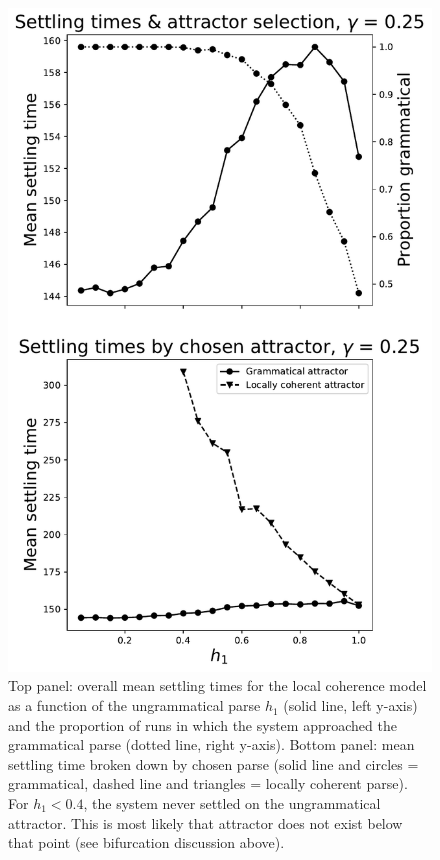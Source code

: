 \documentclass[10pt,letterpaper]{article}
\begin{document}
\begin{figure}[h!]
\includegraphics[width=\linewidth]{../Model/TimesAsFnOfH1.pdf}
\caption{Top panel: overall mean settling times for the local coherence model as a function of the ungrammatical parse $h_1$ (solid line, left y-axis) and the proportion of runs in which the system approached the grammatical parse (dotted line, right y-axis). Bottom panel: mean settling time broken down by chosen parse (solid line and circles = grammatical, dashed line and triangles = locally coherent parse). For $h_1 < 0.4$, the system never settled on the ungrammatical attractor. This is most likely that attractor does not exist below that point (see bifurcation discussion above).}
\label{fnofh1}
\end{figure}
\end{document}
